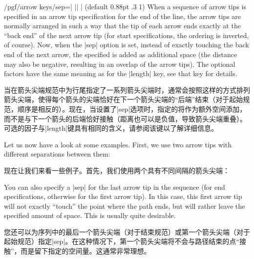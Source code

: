 \begin{key}{/pgf/arrow keys/sep=| || | (default 0.88pt .3 1)%
}
    When a sequence of arrow tips is specified in an arrow tip specification
    for the end of the line, the arrow tips are normally arranged in such a way
    that the tip of each arrow ends exactly at the ``back end'' of the next
    arrow tip (for start specifications, the ordering is inverted, of course).
    Now, when the |sep| option is set, instead of exactly touching the back end
    of the next arrow, the specified  is added as additional
    space (the distance may also be negative, resulting in an overlap of the
    arrow tips). The optional factors have the same meaning as for the |length|
    key, see that key for details.

    当在箭头尖端规范中为行尾指定了一系列箭头尖端时，通常会按照这样的方式排列箭头尖端，使得每个箭头的尖端恰好在下一个箭头尖端的“后端”结束（对于起始规范，顺序是相反的）。现在，当设置了|sep|选项时，指定的将作为额外空间添加，而不是与下一个箭头的后端恰好接触（距离也可以是负值，导致箭头尖端重叠）。可选的因子与|length|键具有相同的含义，请参阅该键以了解详细信息。

    Let us now have a look at some examples. First, we use two arrow tips with
    different separations between them:
    
    现在让我们来看一些例子。首先，我们使用两个具有不同间隔的箭头尖端：

\begin{codeexample}[preamble={\usetikzlibrary{arrows.meta}}]
\end{codeexample}

    You can also specify a |sep| for the last arrow tip in the sequence (for
    end specifications, otherwise for the first arrow tip). In this case, this
    first arrow tip will not exactly ``touch'' the point where the path ends,
    but will rather leave the specified amount of space. This is usually quite
    desirable.
    
    您还可以为序列中的最后一个箭头尖端（对于结束规范）或第一个箭头尖端（对于起始规范）指定|sep|。在这种情况下，第一个箭头尖端将不会与路径结束的点“接触”，而是留下指定的空间量。这通常非常理想。

\begin{codeexample}[preamble={\usetikzlibrary{arrows.meta,positioning}}]
\end{codeexample}
\end{key}
